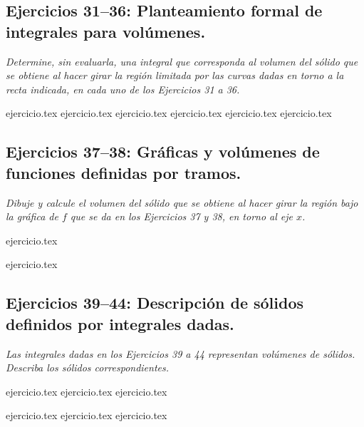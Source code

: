\subsection*{Ejercicios 31--36: Planteamiento formal de integrales para volúmenes.}

\noindent \textit{Determine, sin evaluarla, una integral que corresponda al volumen del sólido que se obtiene al hacer girar la región limitada por las curvas dadas en torno a la recta indicada, en cada uno de los Ejercicios 31 a 36.}

\begin{enumerate}
    \setcounter{enumi}{30}
    {ejercicio.tex}
    {ejercicio.tex}
    {ejercicio.tex}
    {ejercicio.tex}
    {ejercicio.tex}
    {ejercicio.tex}
\end{enumerate}

\subsection*{Ejercicios 37--38: Gráficas y volúmenes de funciones definidas por tramos.}

\noindent \textit{Dibuje y calcule el volumen del sólido que se obtiene al hacer girar la región bajo la gráfica de $f$ que se da en los Ejercicios 37 y 38, en torno al eje $x$.}

\begin{enumerate}
    \setcounter{enumi}{36}
    \begin{minipage}{0.45\textwidth}
    {ejercicio.tex}
    \end{minipage}%
    \begin{minipage}{0.45\textwidth}
    {ejercicio.tex}
    \end{minipage}
\end{enumerate}

\subsection*{Ejercicios 39--44: Descripción de sólidos definidos por integrales dadas.}

\noindent \textit{Las integrales dadas en los Ejercicios 39 a 44 representan volúmenes de sólidos. Describa los sólidos correspondientes.}

\begin{enumerate}
    \setcounter{enumi}{38}
    \begin{minipage}{0.45\textwidth}
    {ejercicio.tex}
    {ejercicio.tex}
    {ejercicio.tex}
    \end{minipage}%
    \begin{minipage}{0.45\textwidth}
    {ejercicio.tex}
    {ejercicio.tex}
    {ejercicio.tex}
    \end{minipage}
\end{enumerate}


